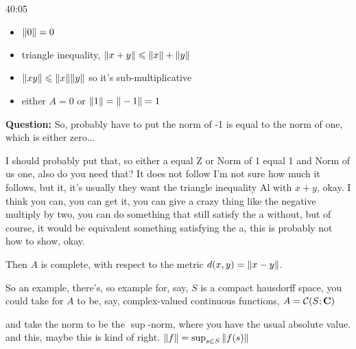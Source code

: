 \begin{example}
\begin{unfinished}{40:05}
\begin{itemize}
\item $\| 0 \| = 0$
\item triangle inequality, $\| x + y \| \leqslant \| x \| + \| y \|$
\item $\| xy \| \leqslant \| x \| \| y \|$ so it's sub-multiplicative
\item either $A = 0$ or $\| 1 \| = \| -1 \| = 1$
\end{itemize}

\textbf{Question:} So, probably have to put the norm of -1 is equal to the norm of one, which is either zero...

 I should probably put that, so either a equal Z or Norm of 1 equal 1 and Norm of us one, also do you need that? It does not follow I'm not sure how much it follows, but it, it's usually they want the triangle inequality Al with $x + y$, okay. I think you can, you can get it, you can give a crazy thing like the negative multiply by two, you can do something that still satisfy the a without, but of course, it would be equivalent something satisfying the a, this is probably not how to show, okay.

Then $A$ is complete, with respect to the metric $d(x,y) = \| x-y \|$. 

\begin{example}
So an example, there's, so example for, say, $S$ is a compact hausdorff space, you could take for $A$ to be, say, complex-valued continuous functions,
$A = \mathcal{C}(S; \mathbf C)$

and take the norm to be the $\sup$-norm, where you have the usual absolute value. 
and this, maybe this is kind of right. 
$\| f \| = \sup_{s \in S} \| f(s) \|$

\end{example}
 
\end{unfinished}
\end{example}
